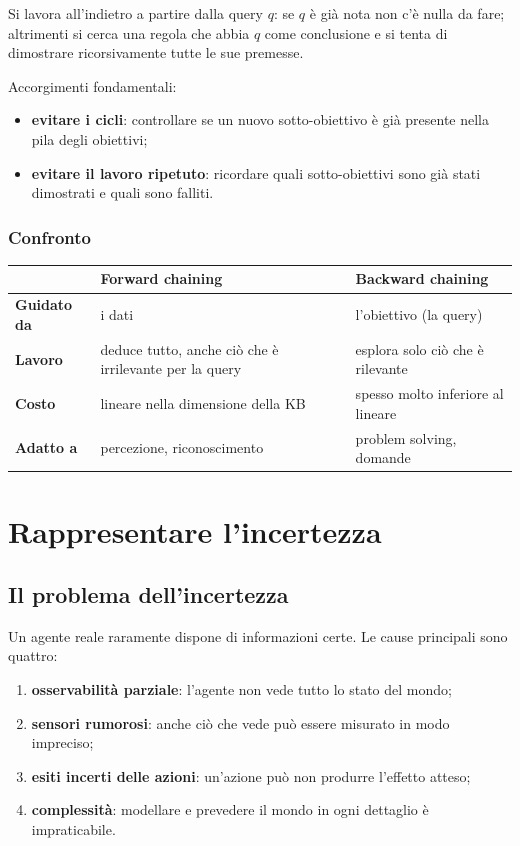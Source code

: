 \documentclass[11pt, a4paper]{article}
\newcommand{\intest}[1]{\textcolor{verde}{\sffamily\bfseries #1}}
\begin{document}
Si lavora all'indietro a partire dalla query $q$: se $q$ è già nota non c'è nulla da fare; altrimenti si cerca una regola che abbia $q$ come conclusione e si tenta di dimostrare ricorsivamente tutte le sue premesse.

Accorgimenti fondamentali:
\begin{itemize}
  \item \textbf{evitare i cicli}: controllare se un nuovo sotto-obiettivo è già presente nella pila degli obiettivi;
  \item \textbf{evitare il lavoro ripetuto}: ricordare quali sotto-obiettivi sono già stati dimostrati e quali sono falliti.
\end{itemize}

\subsubsection*{Confronto}

\begin{center}
  \renewcommand{\arraystretch}{1.35}
  \begin{tabular}{>{\bfseries}l p{5.6cm} p{5.6cm}}
    \toprule
     & \intest{Forward chaining} & \intest{Backward chaining} \\
    \midrule
    Guidato da & i dati & l'obiettivo (la query) \\
    Lavoro & deduce tutto, anche ciò che è irrilevante per la query & esplora solo ciò che è rilevante \\
    Costo & lineare nella dimensione della KB & spesso molto inferiore al lineare \\
    Adatto a & percezione, riconoscimento & problem solving, domande \\
    \bottomrule
  \end{tabular}
\end{center}

\clearpage
\section{Rappresentare l'incertezza}

\subsection{Il problema dell'incertezza}

Un agente reale raramente dispone di informazioni certe. Le cause principali sono quattro:
\begin{enumerate}
  \item \textbf{osservabilità parziale}: l'agente non vede tutto lo stato del mondo;
  \item \textbf{sensori rumorosi}: anche ciò che vede può essere misurato in modo impreciso;
  \item \textbf{esiti incerti delle azioni}: un'azione può non produrre l'effetto atteso;
  \item \textbf{complessità}: modellare e prevedere il mondo in ogni dettaglio è impraticabile.
\end{enumerate}
\end{document}
